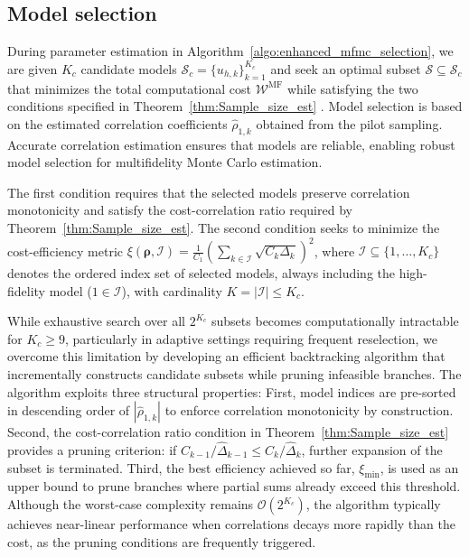 \subsection{Model selection}\label{sec:Model_Selection}


During parameter estimation in Algorithm~\ref{algo:enhanced_mfmc_selection}, we are given $K_c$ candidate models $\mathcal{S}_c = \{ u_{h,k} \}_{k=1}^{K_c}$ and seek an optimal subset $\mathcal{S} \subseteq \mathcal{S}_c$ that minimizes the total computational cost $\mathcal{W}^{\text{MF}}$ while satisfying the two conditions specified in Theorem~\ref{thm:Sample_size_est} \cite{PeWiGu:2016}. Model selection is based on the estimated correlation coefficients $\widehat{\rho}_{1,k}$ obtained from the pilot sampling. Accurate correlation estimation ensures that models are reliable, enabling robust model selection for multifidelity Monte Carlo estimation.  

The first condition requires that the selected models preserve correlation monotonicity and satisfy the cost-correlation ratio required by Theorem~\ref{thm:Sample_size_est}. The second condition seeks to minimize the cost-efficiency metric $\xi(\boldsymbol{\rho},\mathcal{I}) = \frac{1}{C_1}(\sum_{k \in \mathcal{I}} \sqrt{C_k \Delta_k})^2$, where $\mathcal{I} \subseteq \{1, \ldots, K_c\}$ denotes the ordered index set of selected models, always including the high-fidelity model ($1 \in \mathcal{I}$), with cardinality $K = |\mathcal{I}| \leq K_c$.

While exhaustive search over all $2^{K_c}$ subsets \cite{PeWiGu:2016} becomes computationally intractable for $K_c \geq 9$, particularly in adaptive settings requiring frequent reselection, we overcome this limitation by developing an efficient backtracking algorithm that incrementally constructs candidate subsets while pruning infeasible branches. The algorithm exploits three structural properties: First, model indices are pre-sorted in descending order of $|\widehat{\rho}_{1,k}|$  to enforce correlation monotonicity by construction. Second, the cost-correlation ratio condition in Theorem~\ref{thm:Sample_size_est} provides a pruning criterion: if $C_{k-1}/\widehat{\Delta}_{k-1} \leq C_k/\widehat{\Delta}_k$, further expansion of the subset is terminated. Third, the best efficiency achieved so far, $\xi_{\min}$, is used as an upper bound to prune branches where partial sums already exceed this threshold. Although the worst-case complexity remains $\mathcal{O}(2^{K_c})$, the algorithm typically achieves near-linear performance when correlations decays more rapidly than the cost, as the pruning conditions are frequently triggered.

